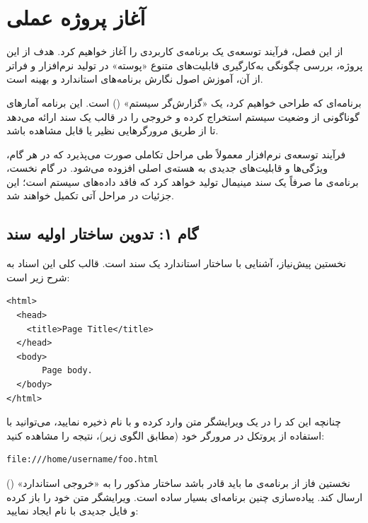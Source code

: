 \chapter{آغاز پروژه عملی}

از این فصل، فرآیند توسعه‌ی یک برنامه‌ی کاربردی را آغاز خواهیم کرد. هدف از این پروژه، بررسی چگونگی به‌کارگیری قابلیت‌های متنوع «پوسته» در تولید نرم‌افزار و فراتر از آن، آموزش اصول نگارش برنامه‌های استاندارد و بهینه است.

برنامه‌ای که طراحی خواهیم کرد، یک «گزارش‌گر سیستم» () است. این برنامه آمارهای گوناگونی از وضعیت سیستم استخراج کرده و خروجی را در قالب یک سند  ارائه می‌دهد تا از طریق مرورگرهایی نظیر  یا  قابل مشاهده باشد.

فرآیند توسعه‌ی نرم‌افزار معمولاً طی مراحل تکاملی صورت می‌پذیرد که در هر گام، ویژگی‌ها و قابلیت‌های جدیدی به هسته‌ی اصلی افزوده می‌شود. در گام نخست، برنامه‌ی ما صرفاً یک سند  مینیمال تولید خواهد کرد که فاقد داده‌های سیستم است؛ این جزئیات در مراحل آتی تکمیل خواهند شد.

\section{گام ۱: تدوین ساختار اولیه سند}

نخستین پیش‌نیاز، آشنایی با ساختار استاندارد یک سند  است. قالب کلی این اسناد به شرح زیر است:

\begin{latin}
\begin{lstlisting}
<html>
  <head>
    <title>Page Title</title>
  </head>
  <body>
       Page body.
  </body>
</html>
\end{lstlisting}
\end{latin}

چنانچه این کد را در یک ویرایشگر متن وارد کرده و با نام  ذخیره نمایید، می‌توانید با استفاده از پروتکل  در مرورگر خود (مطابق الگوی زیر)، نتیجه را مشاهده کنید:

\begin{latin}
\begin{lstlisting}
file:///home/username/foo.html
\end{lstlisting}
\end{latin}

نخستین فاز از برنامه‌ی ما باید قادر باشد ساختار  مذکور را به «خروجی استاندارد» () ارسال کند. پیاده‌سازی چنین برنامه‌ای بسیار ساده است. ویرایشگر متن خود را باز کرده و فایل جدیدی با نام  ایجاد نمایید:

